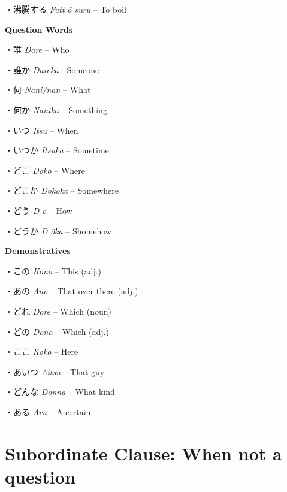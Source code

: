 \par{・沸騰する \emph{Futt }\emph{ō suru }– To boil }

\par{\textbf{Question Words }}

\par{・誰 \emph{Dare }– Who }

\par{・誰か \emph{Dareka }- Someone }

\par{・何 \emph{Nani\slash nan }– What }

\par{・何か \emph{Nanika }– Something }

\par{・いつ \emph{Itsu }– When }

\par{・いつか \emph{Itsuka }– Sometime }

\par{・どこ \emph{Doko }– Where }

\par{・どこか \emph{Dokoka }– Somewhere }

\par{・どう \emph{D }\emph{ō }– How }

\par{・どうか \emph{D }\emph{ōka }– Shomehow }

\par{\textbf{Demonstratives }}

\par{・この \emph{Kono }– This (adj.) }

\par{・あの \emph{Ano }– That over there (adj.) }

\par{・どれ \emph{Dore }– Which (noun) }

\par{・どの \emph{Dono }– Which (adj.) }

\par{・ここ \emph{Koko }– Here }

\par{・あいつ \emph{Aitsu }– That guy }

\par{・どんな \emph{Don\textquotesingle na }– What kind }

\par{・ある \emph{Aru }– A certain }
      
\section{Subordinate Clause: When not a question}
 
